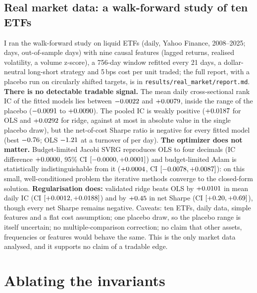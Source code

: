 \documentclass[11pt]{article}
\theoremstyle{remark}
\begin{document}
\subsection{Real market data: a walk-forward study of ten ETFs}\label{sec:market}
I ran the walk-forward study on \RealMktAssets{} liquid ETFs (daily, Yahoo Finance, 2008--2025; \RealMktDaysTotal{} days, \RealMktOosDays{} out-of-sample days) with nine causal features (lagged returns, realised volatility, a volume z-score), a 756-day window refitted every 21 days, a dollar-neutral long-short strategy and 5\,bps cost per unit traded; the full report, with a placebo run on circularly shifted targets, is in \texttt{results/real\_market/report.md}.
\textbf{There is no detectable tradable signal.} The mean daily cross-sectional rank IC of the fitted models lies between ${-}0.0022$ and $+0.0079$, inside the range of the placebo (${-}0.0091$ to $+0.0090$). The pooled IC is weakly positive ($+0.0187$ for OLS and $+0.0292$ for ridge, against at most \RealMktPlaceboPooledMax{} in absolute value in the single placebo draw), but the net-of-cost Sharpe ratio is negative for every fitted model (best ${-}0.76$; OLS ${-}1.21$ at a turnover of \RealMktOlsTurnover{} per day).
\textbf{The optimizer does not matter.} Budget-limited Jacobi SVRG reproduces OLS to four decimals (IC difference $+0.0000$, 95\% CI $[{-}0.0000, +0.0001]$) and budget-limited Adam is statistically indistinguishable from it ($+0.0004$, CI $[{-}0.0078, +0.0087]$): on this small, well-conditioned problem the iterative methods converge to the closed-form solution. \textbf{Regularisation does:} validated ridge beats OLS by $+0.0101$ in mean daily IC (CI $[+0.0012, +0.0188]$) and by $+0.45$ in net Sharpe (CI $[+0.20, +0.69]$), though every net Sharpe remains negative.
Caveats: ten ETFs, daily data, simple features and a flat cost assumption; one placebo draw, so the placebo range is itself uncertain; no multiple-comparison correction; no claim that other assets, frequencies or features would behave the same. This is the only market data analysed, and it supports no claim of a tradable edge.

\section{Ablating the invariants}\label{sec:invariants}
\end{document}
